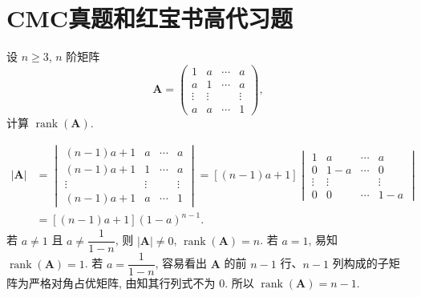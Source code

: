 \documentclass[../../main.tex]{subfiles}%
\begin{document}
\section{CMC真题和红宝书高代习题}

\begin{example}
设 \(n \geqslant 3\), \(n\) 阶矩阵
\[
\boldsymbol{A} = \begin{pmatrix} 1 & a & \cdots & a \\ a & 1 & \cdots & a \\ \vdots & \vdots & & \vdots \\ a & a & \cdots & 1 \end{pmatrix},
\]
计算 \(\operatorname{rank}(\boldsymbol{A})\).
\end{example}
\begin{solution}

\[
\begin{aligned}
|\boldsymbol{A}| &= \begin{vmatrix} (n - 1)a + 1 & a & \cdots & a \\ (n - 1)a + 1 & 1 & \cdots & a \\ \vdots & \vdots & & \vdots \\ (n - 1)a + 1 & a & \cdots & 1 \end{vmatrix} = [(n - 1)a + 1] \begin{vmatrix} 1 & a & \cdots & a \\ 0 & 1 - a & \cdots & 0 \\ \vdots & \vdots & & \vdots \\ 0 & 0 & \cdots & 1 - a \end{vmatrix} \\
&= [(n - 1)a + 1](1 - a)^{n - 1}.
\end{aligned}
\]
若 \(a \neq 1\) 且 \(a \neq \dfrac{1}{1 - n}\), 则 \(|\boldsymbol{A}| \neq 0\), \(\operatorname{rank}(\boldsymbol{A}) = n\). 若 \(a = 1\), 易知 \(\operatorname{rank}(\boldsymbol{A}) = 1\). 若 \(a = \dfrac{1}{1 - n}\), 容易看出 \(\boldsymbol{A}\) 的前 \(n - 1\) 行、\(n - 1\) 列构成的子矩阵为严格对角占优矩阵, 由知其行列式不为 0. 所以 \(\operatorname{rank}(\boldsymbol{A}) = n - 1\).

\end{solution}
\end{document}
